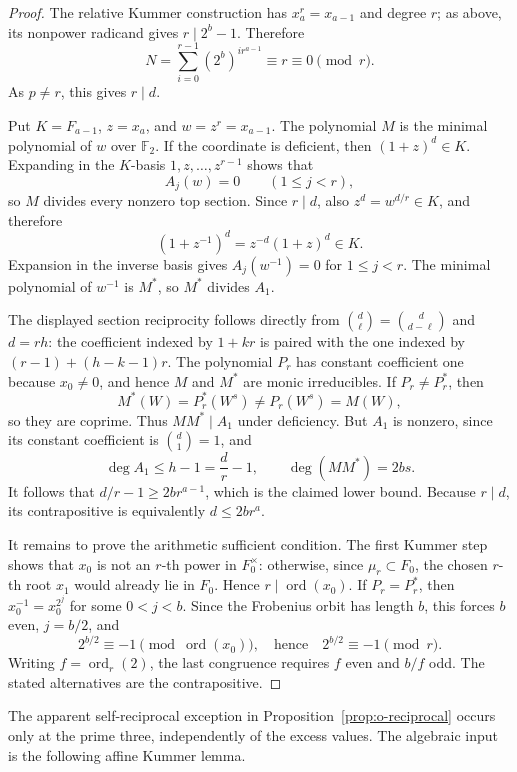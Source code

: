 \documentclass[11pt]{article}
\theoremstyle{definition}
\theoremstyle{remark}
\begin{document}
\begin{proof}
The relative Kummer construction has $x_a^r=x_{a-1}$ and degree $r$; as
above, its nonpower radicand gives $r\mid2^b-1$.  Therefore
\[
 N=\sum_{i=0}^{r-1}(2^b)^{ir^{a-1}}
   \equiv r\equiv0\pmod r.
\]
As $p\ne r$, this gives $r\mid d$.

Put $K=F_{a-1}$, $z=x_a$, and $w=z^r=x_{a-1}$.  The polynomial $M$ is the
minimal polynomial of $w$ over $\mathbb F_2$.  If the coordinate is
deficient, then $(1+z)^d\in K$.  Expanding in the $K$-basis
$1,z,\ldots,z^{r-1}$ shows that
\[
 A_j(w)=0\qquad(1\leq j<r),
\]
so $M$ divides every nonzero top section.  Since $r\mid d$, also
$z^d=w^{d/r}\in K$, and therefore
\[
 (1+z^{-1})^d=z^{-d}(1+z)^d\in K.
\]
Expansion in the inverse basis gives $A_j(w^{-1})=0$ for $1\leq j<r$.
The minimal polynomial of $w^{-1}$ is $M^*$, so $M^*$ divides $A_1$.

The displayed section reciprocity follows directly from
$\binom d\ell=\binom d{d-\ell}$ and $d=rh$: the coefficient indexed by
$1+kr$ is paired with the one indexed by
$(r-1)+(h-k-1)r$.  The polynomial $P_r$ has constant coefficient one
because $x_0\ne0$, and hence $M$ and $M^*$ are monic irreducibles.  If
$P_r\ne P_r^*$, then
\[
 M^*(W)=P_r^*(W^s)\ne P_r(W^s)=M(W),
\]
so they are coprime.  Thus $MM^*\mid A_1$ under deficiency.  But $A_1$ is
nonzero, since its constant coefficient is $\binom d1=1$, and
\[
 \deg A_1\leq h-1=\frac dr-1,
 \qquad \deg(MM^*)=2bs.
\]
It follows that $d/r-1\geq2br^{a-1}$, which is the claimed lower bound.
Because $r\mid d$, its contrapositive is equivalently $d\leq2br^a$.

It remains to prove the arithmetic sufficient condition.  The first Kummer
step shows that $x_0$ is not an $r$-th power in
$F_0^\times$: otherwise, since $\mu_r\subset F_0$, the chosen $r$-th root
$x_1$ would already lie in $F_0$.  Hence $r\mid\operatorname{ord}(x_0)$.
If $P_r=P_r^*$, then $x_0^{-1}=x_0^{2^j}$ for some $0<j<b$.  Since the
Frobenius orbit has length $b$, this forces $b$ even, $j=b/2$, and
\[
 2^{b/2}\equiv-1\pmod {\operatorname{ord}(x_0)},
 \quad\text{hence}\quad
 2^{b/2}\equiv-1\pmod r.
\]
Writing $f=\operatorname{ord}_r(2)$, the last congruence requires $f$ even
and $b/f$ odd.  The stated alternatives are the contrapositive.
\end{proof}

The apparent self-reciprocal exception in
Proposition~\ref{prop:o-reciprocal} occurs only at the prime three,
independently of the excess values.  The algebraic input is the following
affine Kummer lemma.
\end{document}
